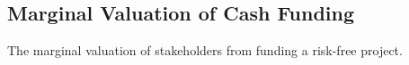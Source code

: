 \documentclass[main.tex]{subfiles}
\begin{document}
	\begin{appendices}
		\section{Marginal Valuation of Cash Funding}
		\label{apx:marginal-valuation-cash-funding}
		The marginal valuation of stakeholders from funding a risk-free project.

		\begin{figure}[H]
			\centering
			\resizebox{\textwidth}{!}{%
				
			}
		\end{figure}

	\end{appendices}
\end{document}
